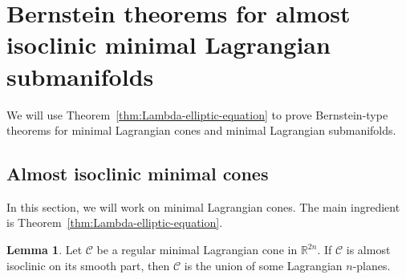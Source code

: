 \documentclass[11pt]{amsart}
\numberwithin{equation}{section}
\theoremstyle{definition}
\theoremstyle{definition}
\newtheorem{definition}[equation]{Definition}
\newtheorem{lemma}[equation]{Lemma}
\newcommand{\set}[1]{\left\{#1\right\}}
\newcommand{\pr}[1]{\left(#1\right)}
\newcommand{\bb}[1]{\mathbb{#1}} \newcommand{\td}[1]{\widetilde{#1}}
\begin{document}
\section{\bf Bernstein theorems for almost isoclinic minimal Lagrangian submanifolds}
\label{sec:Bernstein}

We will use Theorem~\ref{thm:Lambda-elliptic-equation} to prove Bernstein-type theorems for minimal Lagrangian cones and minimal Lagrangian submanifolds.



\subsection{Almost isoclinic minimal cones}

In this section, we will work on minimal Lagrangian cones.
The main ingredient is Theorem~\ref{thm:Lambda-elliptic-equation}. 






\begin{lemma}
	\label{lem:cone-rigidity}
	Let $\mathcal C$ be a regular minimal Lagrangian cone in $\bb R^{2n}.$
	If $\mathcal C$ is almost isoclinic on its smooth part, then $\mathcal C$ is the union of some Lagrangian $n$-planes.
\end{lemma}
\end{document}
